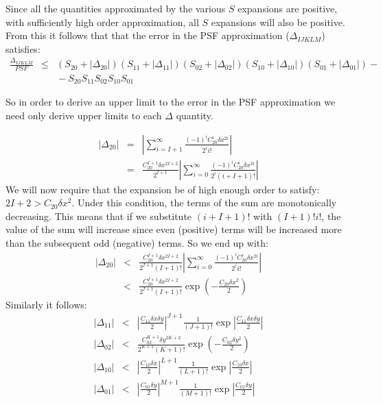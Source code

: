 \documentclass{article}
\begin{document}
Since all the quantities approximated by the various $S$ expansions are
positive, with sufficiently high order approximation, all $S$ expansions will
also be positive. From this it follows that that the error in the PSF
approximation ($\Delta_{IJKLM}$) satisfies:
\begin{eqnarray}
	\frac{\Delta_{IJKLM}}{PSF}&\le&
	(S_{20}+|\Delta_{20}|)(S_{11}+|\Delta_{11}|)(S_{02}+|\Delta_{02}|)
	(S_{10}+|\Delta_{10}|)(S_{01}+|\Delta_{01}|) - {} \nonumber\\
	&& {} - S_{20}S_{11}S_{02}S_{10}S_{01}
\end{eqnarray}

So in order to derive an upper limit to the error in the PSF approximation we
need only derive upper limits to each $\Delta$ quantity.

\begin{eqnarray}
	|\Delta_{20}|&=&\left|\sum_{i=I+1}^\infty
	\frac{(-1)^i C_{20}^i \delta x^{2i}}{2^i i!}\right|\nonumber\\
	&=&\frac{C_{20}^{I+1}\delta x^{2I+2}}{2^{I+1}}\left|
	\sum_{i=0}^\infty \frac{(-1)^i C_{20}^i \delta x^{2i}}{2^i (i+I+1)!}
	\right|
\end{eqnarray}	
We will now require that the expansion be of high enough order to satisfy:
$2I+2>C_{20}\delta x^2$. Under this condition, the terms of the sum are
monotonically decreasing. This means that if we substitute $(i+I+1)!$ with
$(I+1)! i!$, the value of the sum will increase since even (positive) terms
will be increased more than the subsequent odd (negative) terms. So we end up
with:
\begin{eqnarray}
	|\Delta_{20}|&<&\frac{C_{20}^{I+1}\delta x^{2I+2}}{2^{I+1}(I+1)!}\left|
	\sum_{i=0}^\infty \frac{(-1)^i C_{20}^i \delta x^{2i}}{2^i i!}
	\right|\nonumber\\
	&<&\frac{C_{20}^{I+1}\delta x^{2I+2}}{2^{I+1}(I+1)!}
	\exp\left(-\frac{C_{20}\delta x^2}{2}\right)
\end{eqnarray}
Similarly it follows:
\begin{eqnarray}
	|\Delta_{11}|&<&\left|\frac{C_{11}\delta x\delta y}{2}\right|^{J+1}
	\frac{1}{(J+1)!}
	\exp\left|\frac{C_{11}\delta x\delta y}{2}\right|\\
%
	|\Delta_{02}|&<&\frac{C_{02}^{K+1}\delta y^{2K+2}}{2^{K+1}(K+1)!}
	\exp\left(-\frac{C_{02}\delta y^2}{2}\right)\\
%
	|\Delta_{10}|&<&\left|\frac{C_{10}\delta x}{2}\right|^{L+1}
	\frac{1}{(L+1)!}
	\exp\left|\frac{C_{10}\delta x}{2}\right|\\
%
	|\Delta_{01}|&<&\left|\frac{C_{01}\delta y}{2}\right|^{M+1}
	\frac{1}{(M+1)!}
	\exp\left|\frac{C_{01}\delta y}{2}\right|
\end{eqnarray}
\end{document}
